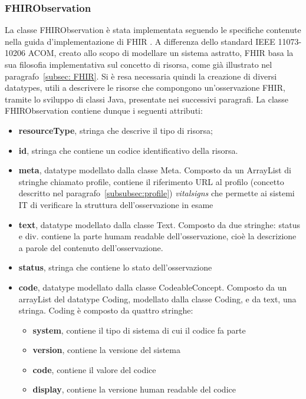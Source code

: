 \documentclass[a4paper]{article}
\begin{document}
\subsubsection{FHIRObservation}
La classe FHIRObservation è stata implementata seguendo le specifiche contenute nella guida d'implementazione di FHIR \cite{FHIROBSERVATION}.
A differenza dello standard IEEE 11073-10206 ACOM, creato allo scopo di modellare un sistema astratto, FHIR basa la sua filosofia implementativa sul concetto di risorsa, come già illustrato nel paragrafo~\ref{subsec: FHIR}.
Si è resa necessaria quindi la creazione di diversi datatypes, utili a descrivere le risorse che compongono un'osservazione FHIR, tramite lo sviluppo di classi Java, presentate nei successivi paragrafi.
La classe FHIRObservation contiene dunque i seguenti attributi:
\begin{itemize}
    \item \textbf{resourceType}, stringa che descrive il tipo di risorsa;
    \item \textbf{id}, stringa che contiene un codice identificativo della risorsa.
    \item \textbf{meta}, datatype modellato dalla classe Meta. Composto da un ArrayList di stringhe chiamato profile, contiene il riferimento URL al profilo (concetto descritto nel paragrafo~\ref{subsubsec:profile}) \textit{vitalsigns} che permette ai sistemi IT di verificare la struttura dell'osservazione in esame
    \item \textbf{text}, datatype modellato dalla classe Text. Composto da due stringhe: status e div.
    contiene la parte humam readable dell'osservazione, cioè la descrizione a parole del contenuto dell'osservazione.
    \item \textbf{status}, stringa che contiene lo stato dell'osservazione
    \item \textbf{code}, datatype modellato dalla classe CodeableConcept. Composto da un arrayList del datatype Coding, modellato dalla classe Coding, e da text, una stringa.
    Coding è composto da quattro stringhe:
    \begin{itemize}
        \item \textbf{system}, contiene il tipo di sistema di cui il codice fa parte
        \item \textbf{version}, contiene la versione del sistema
        \item \textbf{code}, contiene il valore del codice 
        \item \textbf{display}, contiene la versione human readable del codice

\end{itemize}
\end{itemize}
\end{document}
